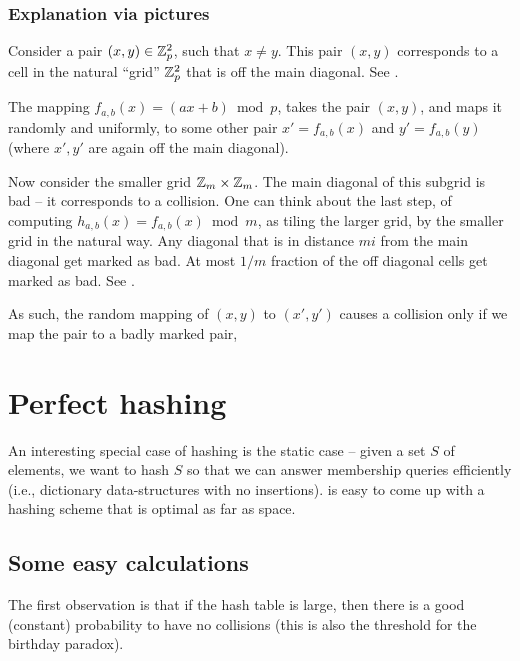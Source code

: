 \subsubsection{Explanation via pictures}

Consider a pair $(x,y)\in \mathbb{Z}_p^2$, such that $x \neq y$. This pair
$(x,y)$ corresponds to a cell in the natural ``grid'' $\mathbb{Z}_p^2$ that
is off the main diagonal.  See .


The mapping $f_{a,b}(x) = (ax + b) \bmod p$, takes the pair $(x,y)$,
and maps it randomly and uniformly, to some other pair
$x' = f_{a,b}(x)$ and $y' = f_{a,b}(y)$ (where $x', y'$ are again off
the main diagonal).

Now consider the smaller grid $\mathbb{Z}_m \times \mathbb{Z}_m$. The main diagonal of this
\si{subgrid} is bad -- it corresponds to a collision. One can think about
the last step, of computing $h_{a,b}(x) = f_{a,b}(x) \bmod m$, as tiling
the larger grid, by the smaller grid in the natural way. Any diagonal
that is in distance $mi$ from the main diagonal get marked as bad. At
most $1/m$ fraction of the off diagonal cells get marked as bad.  See
.

As such, the random mapping of $(x,y)$ to $(x',y')$ causes a collision
only if we map the pair to a badly marked pair, 





\section{Perfect hashing}%


An interesting special case of hashing is the static case -- given a
set $S$ of elements, we want to hash $S$ so that we can answer
membership queries efficiently (i.e., dictionary data-structures with
no insertions).  is easy to come up with a hashing scheme that is
optimal as far as space.


\subsection{Some easy calculations}

The first observation is that if the hash table is  large,
then there is a good (constant) probability to have no collisions
(this is also the threshold for the birthday paradox).

